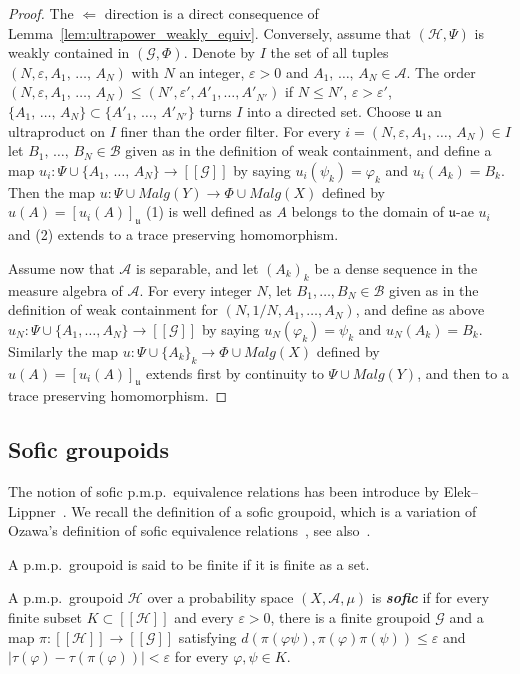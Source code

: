 \documentclass[AHL,Unicode,longabstracts,published]{cedram}
\newcommand{\defin}[1]{\textbf{\emph{#1}}}
\newcommand{\cH}{\mathcal{H}}
\newcommand{\ch}{\mathcal{H}}
\newcommand{\cg}{\mathcal{G}}
\newcommand{\ra}{\mathscr{A}}
\newcommand{\rb}{\mathscr{B}}
\newcommand{\ul}{\mathfrak{u}}
\newcommand{\eps}{\varepsilon}
\newcommand{\ph}{\varphi}
\newcommand{\pmp}{p.m.p.\ }
\begin{document}
\begin{proof}
The $\Leftarrow$ direction is a direct consequence of Lemma~\ref{lem:ultrapower_weakly_equiv}. Conversely, assume that $(\cH,\Psi)$ is weakly contained in $(\cg,\Phi)$. Denote by $I$ the set of all tuples $(N,\varepsilon,A_1,\,\dots,\,A_N)$ with $N$ an integer, $\varepsilon>0$ and $A_1,\,\dots,\,A_N \in \ra$. The order $(N,\varepsilon,A_1,\,\dots,\,A_N)\leq (N',\varepsilon',A'_1,\dots,A'_{N'})$ if $N \leq N'$, $\varepsilon>\varepsilon'$, $\{A_1,\,\dots,\,A_N\} \subset \{A'_1,\,\dots,\,A'_{N'}\}$ turns $I$ into a directed set. Choose $\ul$ an ultraproduct on $I$ finer than the order filter. For every $i=(N,\varepsilon,A_1,\,\dots,\,A_N) \in I$ let $B_1,\,\dots,\,B_N \in \rb$ given as in the definition of weak containment, and define a map $u_i\colon \Psi \cup \{A_1,\,\dots,\,A_N\} \to [[\cg]]$ by saying $u_i(\psi_k)=\ph_k$ and $u_i(A_k)=B_k$. Then the map $u\colon \Psi \cup Malg(Y)\to \Phi \cup Malg(X)$ defined by $u(A) = [u_i(A)]_\ul$ (1) is well defined as $A$ belongs to the domain of $\ul$-ae $u_i$ and (2) extends to a trace preserving homomorphism.

Assume now that $\ra$ is separable, and let $(A_k)_k$ be a dense sequence in the measure algebra of $\ra$. For every integer $N$, let $B_1,\dots,B_N \in \rb$ given as in the definition of weak containment for $(N,1/N,A_1,\dots,A_N)$, and define as above $u_N\colon \Psi \cup \{A_1,\dots,A_N\} \to [[\cg]]$ by saying $u_N(\ph_k)=\psi_k$ and $u_N(A_k)=B_k$. Similarly the map $u\colon \Psi \cup \{A_k\}_k\to \Phi \cup Malg(X)$ defined by $u(A) = [u_i(A)]_\ul$ extends first by continuity to $\Psi \cup Malg(Y)$, and then to a trace preserving homomorphism.
\end{proof}

\subsection{Sofic groupoids}\label{sect: sofic groupoids}
The notion of sofic \pmp equivalence relations has been introduce by Elek--Lippner~\cite{Elek-Lippner-2010}. We recall the definition of a sofic groupoid, which is a variation of Ozawa's definition of sofic equivalence relations~\cite{Ozawa-hyp-sofic}, see also~\cite{Cordeiro-2017}.


A \pmp groupoid is said to be finite if it is finite as a set.

\begin{defi}\label{def:sofic_groupoid}
A \pmp groupoid $\ch$ over a probability space $(X,\ra,\mu)$ is
\defin{sofic} if for every finite subset $K \subset [[\ch]]$ and every $\varepsilon>0$, there is a finite groupoid $\cg$ and a map $\pi \colon [[\ch]] \to [[\cg]]$ satisfying $d(\pi(\ph\psi),\pi(\ph)\pi(\psi)) \leq \eps$ and $|\tau(\ph) - \tau(\pi(\ph))|<\eps$ for every $\ph,\psi \in K$.
\end{defi}
\end{document}

